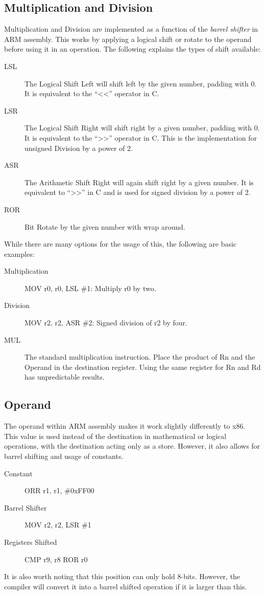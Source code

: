 			\subsection{Multiplication and Division}
				Multiplication and Division are implemented as a function of the \emph{barrel shifter} in ARM assembly. 
				This works by applying a logical shift or rotate to the operand before using it in an operation. 
				The following explains the types of shift available:
				\begin{description}
					\item[LSL] The Logical Shift Left will shift left by the given number, padding with 0.
						It is equivalent to the ``<<'' operator in C.
					\item[LSR] The Logical Shift Right will shift right by a given number, padding with 0. 
						It is equivalent to the ``>>'' operator in C. 
						This is the implementation for unsigned Division by a power of 2.
					\item[ASR] The Arithmetic Shift Right will again shift right by a given number. 
						It is equivalent to ``>>'' in C and is used for signed division by a power of 2.  
					\item[ROR] Bit Rotate by the given number with wrap around.
				\end{description}
				While there are many options for the usage of this, the following are basic examples:
				\begin{description}
					\item[Multiplication] MOV r0, r0, LSL \#1: Multiply r0 by two. 
					\item[Division] MOV r2, r2, ASR \#2: Signed division of r2 by four. 
					\item[MUL] The standard multiplication instruction. 
						Place the product of Rn and the Operand in the destination register. 
						Using the same register for Rn and Rd has unpredictable results. 
				\end{description}

			\subsection{Operand}
				The operand within ARM assembly makes it work slightly differently to x86. 
				This value is used instead of the destination in mathematical or logical operations, with the destination acting only as a store.
				However, it also allows for barrel shifting and usage of constants. 
				\begin{description}
					\item[Constant] ORR r1, r1, \#0xFF00 
					\item[Barrel Shifter] MOV r2, r2, LSR \#1					
					\item[Registers Shifted] CMP r9, r8 ROR r0
				\end{description}
				It is also worth noting that this position can only hold 8-bits. 
				However, the compiler will convert it into a barrel shifted operation if it is larger than this. 

